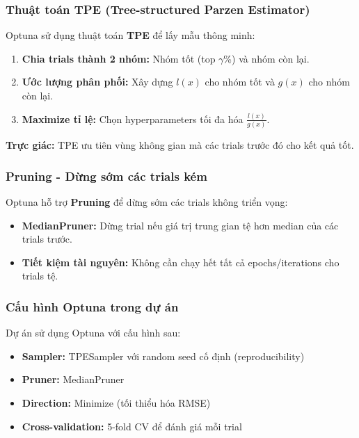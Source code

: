 \documentclass[12pt,a4paper]{article}
\begin{document}
\subsubsection{Thuật toán TPE (Tree-structured Parzen Estimator)}

Optuna sử dụng thuật toán \textbf{TPE} để lấy mẫu thông minh:

\begin{enumerate}
    \item \textbf{Chia trials thành 2 nhóm:} Nhóm tốt (top $\gamma$\%) và nhóm còn lại.
    \item \textbf{Ước lượng phân phối:} Xây dựng $l(x)$ cho nhóm tốt và $g(x)$ cho nhóm còn lại.
    \item \textbf{Maximize tỉ lệ:} Chọn hyperparameters tối đa hóa $\frac{l(x)}{g(x)}$.
\end{enumerate}

\textbf{Trực giác:} TPE ưu tiên vùng không gian mà các trials trước đó cho kết quả tốt.

\subsubsection{Pruning - Dừng sớm các trials kém}

Optuna hỗ trợ \textbf{Pruning} để dừng sớm các trials không triển vọng:

\begin{itemize}
    \item \textbf{MedianPruner:} Dừng trial nếu giá trị trung gian tệ hơn median của các trials trước.
    \item \textbf{Tiết kiệm tài nguyên:} Không cần chạy hết tất cả epochs/iterations cho trials tệ.
\end{itemize}

\subsubsection{Cấu hình Optuna trong dự án}

Dự án sử dụng Optuna với cấu hình sau:
\begin{itemize}
    \item \textbf{Sampler:} TPESampler với random seed cố định (reproducibility)
    \item \textbf{Pruner:} MedianPruner
    \item \textbf{Direction:} Minimize (tối thiểu hóa RMSE)
    \item \textbf{Cross-validation:} 5-fold CV để đánh giá mỗi trial
\end{itemize}
\end{document}
